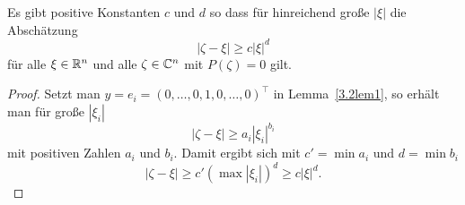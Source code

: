 \begin{cor}\label{3.2lem2}
Es gibt positive Konstanten $c$ und $d$ so dass für hinreichend große $|\xi|$ die Abschätzung 
\begin{equation}
|\zeta- \xi|\ge c |\xi|^{d}
\end{equation} 
für alle $\xi\in\mathbb R^n$ und alle $\zeta\in\mathbb C^n$ mit $P(\zeta)=0$ gilt.
\end{cor} 
\begin{proof}
Setzt man $y=e_i=(0,\ldots, 0, 1, 0, \ldots, 0)^\top$ in Lemma~\ref{3.2lem1}, so erhält man für große $|\xi_i|$
\begin{equation}
|\zeta-\xi|\ge a_i |\xi_i|^{b_i}
\end{equation}
mit positiven Zahlen $a_i$ und $b_i$. Damit ergibt sich mit $c'=\min a_i$ und $d=\min b_i$ 
\begin{equation}
|\zeta - \xi|\ge c'(\max |\xi_i|)^d \ge c |\xi|^d.
\end{equation}
\end{proof}

